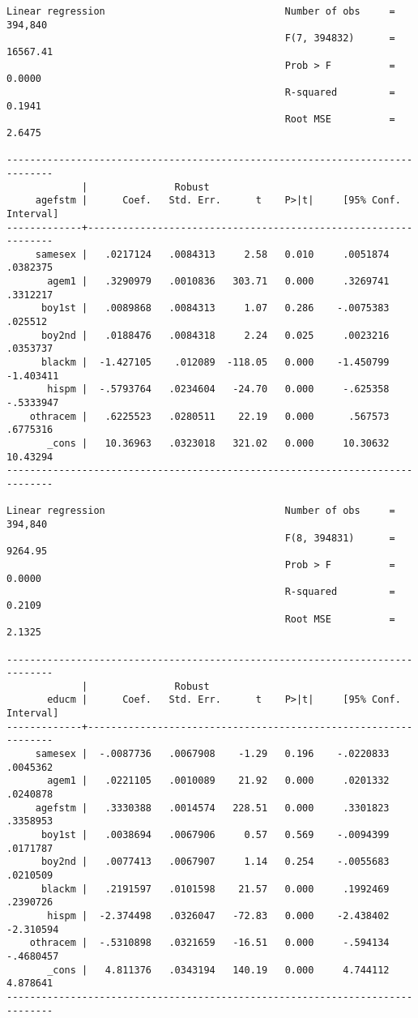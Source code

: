 \documentclass[cache=false]{article}
\begin{document}
\begin{verbatim}
Linear regression                               Number of obs     =    394,840
                                                F(7, 394832)      =   16567.41
                                                Prob > F          =     0.0000
                                                R-squared         =     0.1941
                                                Root MSE          =     2.6475

------------------------------------------------------------------------------
             |               Robust
     agefstm |      Coef.   Std. Err.      t    P>|t|     [95% Conf. Interval]
-------------+----------------------------------------------------------------
     samesex |   .0217124   .0084313     2.58   0.010     .0051874    .0382375
       agem1 |   .3290979   .0010836   303.71   0.000     .3269741    .3312217
      boy1st |   .0089868   .0084313     1.07   0.286    -.0075383     .025512
      boy2nd |   .0188476   .0084318     2.24   0.025     .0023216    .0353737
      blackm |  -1.427105    .012089  -118.05   0.000    -1.450799   -1.403411
       hispm |  -.5793764   .0234604   -24.70   0.000     -.625358   -.5333947
    othracem |   .6225523   .0280511    22.19   0.000      .567573    .6775316
       _cons |   10.36963   .0323018   321.02   0.000     10.30632    10.43294
------------------------------------------------------------------------------

Linear regression                               Number of obs     =    394,840
                                                F(8, 394831)      =    9264.95
                                                Prob > F          =     0.0000
                                                R-squared         =     0.2109
                                                Root MSE          =     2.1325

------------------------------------------------------------------------------
             |               Robust
       educm |      Coef.   Std. Err.      t    P>|t|     [95% Conf. Interval]
-------------+----------------------------------------------------------------
     samesex |  -.0087736   .0067908    -1.29   0.196    -.0220833    .0045362
       agem1 |   .0221105   .0010089    21.92   0.000     .0201332    .0240878
     agefstm |   .3330388   .0014574   228.51   0.000     .3301823    .3358953
      boy1st |   .0038694   .0067906     0.57   0.569    -.0094399    .0171787
      boy2nd |   .0077413   .0067907     1.14   0.254    -.0055683    .0210509
      blackm |   .2191597   .0101598    21.57   0.000     .1992469    .2390726
       hispm |  -2.374498   .0326047   -72.83   0.000    -2.438402   -2.310594
    othracem |  -.5310898   .0321659   -16.51   0.000     -.594134   -.4680457
       _cons |   4.811376   .0343194   140.19   0.000     4.744112    4.878641
------------------------------------------------------------------------------
\end{verbatim}
\end{document}

